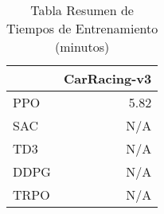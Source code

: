 \begin{table}
\caption{Tabla Resumen de Tiempos de Entrenamiento (minutos)}
\label{tab:training_times}
\begin{tabular}{lr}
\toprule
 & CarRacing-v3 \\
\midrule
PPO & 5.82 \\
SAC & N/A \\
TD3 & N/A \\
DDPG & N/A \\
TRPO & N/A \\
\bottomrule
\end{tabular}
\end{table}
